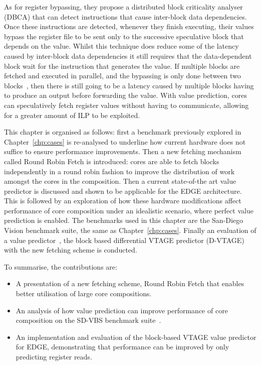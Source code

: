 As for register bypassing, they propose a distributed block criticality analyser (DBCA) that can detect instructions that cause inter-block data dependencies.
Once these instructions are detected, whenever they finish executing, their values bypass the register file to be sent only to the successive speculative block that depends on the value.
Whilst this technique does reduce some of the latency caused by inter-block data dependencies it still requires that the data-dependent block wait for the instruction that generates the value.
If multiple blocks are fetched and executed in parallel, and the bypassing is only done between two blocks~\cite{robatmili2011uniproc}, then there is still going to be a latency caused by multiple blocks having to produce an output before forwarding the value.
With value prediction, cores can speculatively fetch register values without having to communicate, allowing for a greater amount of ILP to be exploited.

This chapter is organised as follows: first a benchmark previously explored in Chapter~\ref{chp:cases} is re-analysed to underline how current hardware does not suffice to ensure performance improvements.
Then a new fetching mechanism called Round Robin Fetch is introduced: cores are able to fetch blocks independently in a round robin fashion to improve the distribution of work amongst the cores in the composition.
Then a current state-of-the art value predictor is discussed and shown to be applicable for the EDGE architecture.
This is followed by an exploration of how these hardware modifications affect performance of core composition under an idealistic scenario, where perfect value prediction is enabled.
The benchmarks used in this chapter are the San-Diego Vision benchmark suite, the same as Chapter~\ref{chp:cases}.
Finally an evaluation of a value predictor~\cite{peraisBeBop2015}, the block based differential VTAGE predictor (D-VTAGE) with the new fetching scheme is conducted.

To summarise, the contributions are:

\begin{itemize}
\item A presentation of a new fetching scheme, Round Robin Fetch that enables better utilisation of large core compositions.
\vspace{-1em}
\item An analysis of how value prediction can improve performance of core composition on the SD-VBS benchmark suite~\cite{sdvbs}.
\vspace{-1em}
\item An implementation and evaluation of the block-based VTAGE value predictor for EDGE, demonstrating that performance can be improved by only predicting register reads.
\end{itemize}
